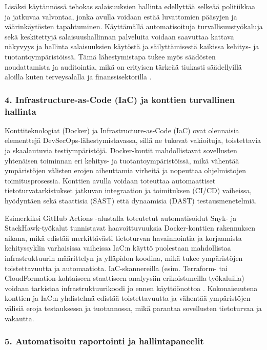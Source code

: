 \documentclass[bscthesis,finnish,oneside,biblatex]{uefcsthesis}
\begin{document}
Lisäksi käytännössä tehokas salaisuuksien hallinta edellyttää selkeää politiikkaa ja jatkuvaa valvontaa, jonka avulla voidaan estää luvattomien pääsyjen ja väärinkäytösten tapahtuminen. Käyttämällä automatisoituja turvallisuustyökaluja sekä keskitettyjä salaisuushallinnan palveluita voidaan saavuttaa kattava näkyvyys ja hallinta salaisuuksien käytöstä ja säilyttämisestä kaikissa kehitys- ja tuotantoympäristöissä. Tämä lähestymistapa tukee myös säädösten noudattamista ja auditointia, mikä on erityisen tärkeää tiukasti säädellyillä aloilla kuten terveysalalla ja finanssisektorilla \cite{byman2024continuous}.


\subsubsection{4. Infrastructure-as-Code (IaC) ja konttien turvallinen hallinta}

Konttiteknologiat (Docker) ja Infrastructure-as-Code (IaC) ovat olennaisia elementtejä DevSecOps-lähestymistavassa, sillä ne tukevat vakioituja, toistettavia ja skaalautuvia testiympäristöjä. Docker-kontit mahdollistavat sovellusten yhtenäisen toiminnan eri kehitys- ja tuotantoympäristöissä, mikä vähentää ympäristöjen välisten erojen aiheuttamia virheitä ja nopeuttaa ohjelmistojen toimitusprosessia. Konttien avulla voidaan toteuttaa automaattiset tietoturvatarkistukset jatkuvan integraation ja toimituksen (CI/CD) vaiheissa, hyödyntäen sekä staattisia (SAST) että dynaamisia (DAST) testausmenetelmiä. \cite{marandi2023_ias,putra2022_devsecops,feio2024_empirical}

Esimerkiksi GitHub Actions -alustalla toteutetut automatisoidut Snyk- ja StackHawk-työkalut tunnistavat haavoittuvuuksia Docker-konttien rakennuksen aikana, mikä edistää merkittävästi tietoturvan havainnointia ja korjaamista kehityssyklin varhaisissa vaiheissa \cite{marandi2023_ias}IaC:n käyttö puolestaan mahdollistaa infrastruktuurin määrittelyn ja ylläpidon koodina, mikä tukee ympäristöjen toistettavuutta ja automaatiota. IaC-skannereilla (esim. Terraform- tai CloudFormation-kohtaiseen staattiseen analyysiin erikoistuneilla työkaluilla) voidaan tarkistaa infrastruktuurikoodi jo ennen käyttöönottoa \cite{marandi2023_ias}. Kokonaisuutena konttien ja IaC:n yhdistelmä edistää toistettavuutta ja vähentää ympäristöjen välisiä eroja testauksessa ja tuotannossa, mikä parantaa sovellusten tietoturvaa ja vakautta.

\subsubsection{5. Automatisoitu  raportointi ja hallintapaneelit}
\end{document}
